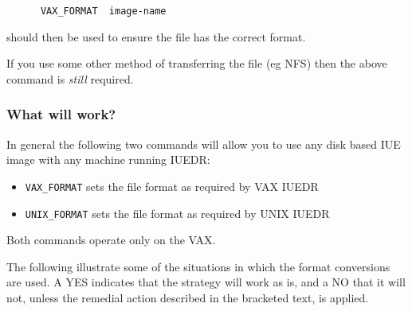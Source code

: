 \begin{verbatim}
      VAX_FORMAT  image-name
\end{verbatim}

should then be used to ensure the file has the correct format.

If you use some other method of transferring the file (eg NFS) then 
the above command is {\em still} required.

\subsubsection{What will work?}

In general the following two commands will allow you to use any disk
based IUE image with any machine running IUEDR:

\begin{itemize}
\item {\tt VAX\_FORMAT} sets the file format as required by VAX IUEDR
\item {\tt UNIX\_FORMAT} sets the file format as required by UNIX IUEDR
\end{itemize}

Both commands operate only on the VAX.

The following illustrate some of the situations in which the format
conversions are used. A YES indicates that the strategy will work as
is, and  a NO that it will not, unless the remedial action described
in the bracketed text, is applied.

